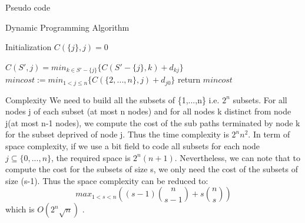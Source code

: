 \documentclass[../report.tex]{subfiles}
\begin{document}
\begin{subsection}{Pseudo code}
\begin{algorithm}[H]
\caption{Dynamic Programming Algorithm}
\begin{algorithmic} 
\STATE Initialization
\STATE $C(\{j\},j)=0$
\ENDFOR

         \STATE $C(S',j)=min_{k \in S'-\{j\}}\{C(S'-\{j\},k)+d_{kj}\}$
      \ENDFOR
   \ENDFOR
\ENDFOR
\STATE $mincost := min_{1<j \leq n}\{C(\{2,...,n\},j)+d_{j0}\}$
\STATE return $mincost$
\end{algorithmic}
\end{algorithm}

\end{subsection}




\begin{subsection}{Complexity}
   We need to build all the subsets of \{1,...,n\} i.e. $2^n$ subsets. For all nodes j of each subset (at most n nodes) and for all nodes k distinct from node j(at most n-1 nodes), we compute the cost of the sub paths terminated by node k for the subset deprived of node j.
Thus the time complexity is $2^n n^2$.
\newline{} In term of space complexity, if we use a bit field to code all subsets for each node $j \subseteq \{0,...,n\}$, the required space is $2^n (n+1)$.
\newline{} Nevertheless, we can note that to compute the cost for the subsets of size s, we only need the cost of the subsets of size (s-1). Thus the space complexity can be reduced to:
$$  max_{1<s<n}((s-1) \binom{n}{s-1} + s\binom{n}{s})$$
which is $O(2^n\sqrt n)$ .
\end{subsection}
\end{document}
